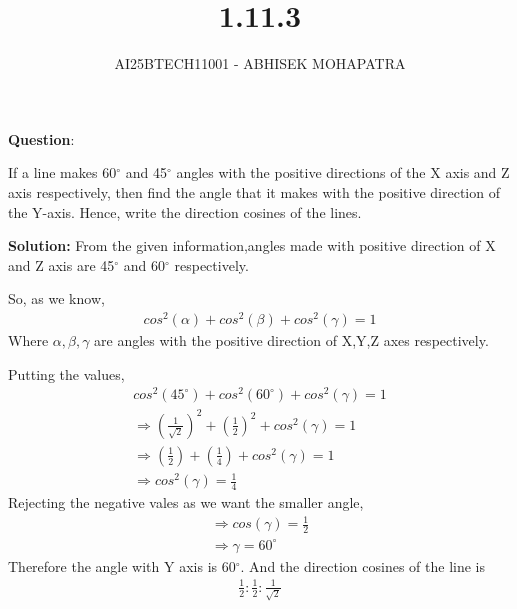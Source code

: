 \documentclass[journal,12pt,onecolumn]{IEEEtran}
\begin{document}
\title{1.11.3}
\author{AI25BTECH11001 - ABHISEK MOHAPATRA}
{\let\newpage\relax\maketitle}

		\textbf{Question}:

	 If a line makes 60$^\circ$ and 45$^\circ$ angles with the 
	 positive directions of the X axis and Z axis respectively, then find the angle that it makes 
	 with the positive direction of the Y-axis. Hence, write the direction cosines of the lines.

		\textbf{Solution:} From the given information,angles made with positive direction of X and Z axis are 45$^\circ$ and 60$^\circ$ respectively.
		
		So, as we know,
		\begin{align}
			cos^2(\alpha) + cos^2(\beta) + cos^2(\gamma) = 1 
		\end{align}
		Where $\alpha,\beta,\gamma$ are angles with the positive direction of X,Y,Z axes respectively.


		Putting the values, 
		\begin{align}
			cos^2(45^\circ) + cos^2(60^\circ) + cos^2(\gamma) = 1 
			\\
			\Rightarrow	(\frac{1}{\sqrt{2}})^2 + (\frac{1}{2})^2 + cos^2(\gamma) = 1
			\\
			\Rightarrow	(\frac{1}{{2}}) + (\frac{1}{4}) + cos^2(\gamma) = 1
			\\
			\Rightarrow	cos^2(\gamma) = \frac{1}{4}
		\end{align}
		Rejecting the negative vales as we want the smaller angle,
		\begin{align}
			\Rightarrow	cos(\gamma) = \frac{1}{2}
			\\
			\Rightarrow     \gamma = 60^\circ
		\end{align}
		Therefore the angle with Y axis is 60$^\circ$.
		And the direction cosines of the line is 
\begin{align}
	\frac{1}{2}:\frac{1}{2}:\frac{1}{\sqrt{2}}
\end{align}
\end{document}
